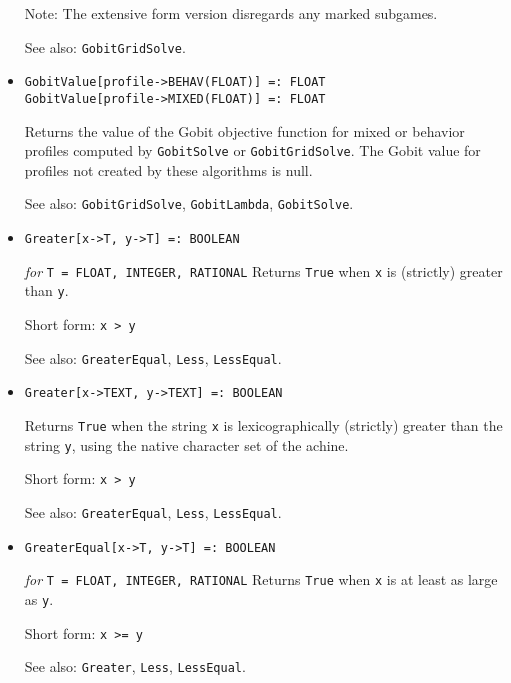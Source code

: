 \begin{itemize}
\item
[Note:] The extensive form version disregards any marked
subgames.
\item [See also:] \verb+GobitGridSolve+.
\ed

\item{}
\protect \large \begin{verbatim}
GobitValue[profile->BEHAV(FLOAT)] =: FLOAT
GobitValue[profile->MIXED(FLOAT)] =: FLOAT
\end{verbatim}\normalsize

\bd
Returns the value of the Gobit objective function for mixed or behavior
profiles computed by \verb+GobitSolve+ or \verb+GobitGridSolve+.  The Gobit
value for profiles not created by these algorithms is null.
\item
[See also:] \verb+GobitGridSolve+, \verb+GobitLambda+, \verb+GobitSolve+.
\ed

\item{}
\protect \large \begin{verbatim}
Greater[x->T, y->T] =: BOOLEAN
\end{verbatim}\normalsize

{\it for} {\tt T = FLOAT, INTEGER, RATIONAL}
\bd
Returns \verb+True+ when \verb+x+ is (strictly) greater than \verb+y+.
\item
[Short form:] \verb+x > y+
\item
[See also:] \verb+GreaterEqual+, \verb+Less+, \verb+LessEqual+.
\ed

\item{}
\protect \large \begin{verbatim}
Greater[x->TEXT, y->TEXT] =: BOOLEAN
\end{verbatim}\normalsize

\bd
Returns \verb+True+ when the string \verb+x+ is lexicographically (strictly)
greater than the string \verb+y+, using the native character set of the 
achine.
\item
[Short form:] \verb+x > y+
\item
[See also:] \verb+GreaterEqual+, \verb+Less+, \verb+LessEqual+.
\ed

\item{}
\protect \large \begin{verbatim}
GreaterEqual[x->T, y->T] =: BOOLEAN
\end{verbatim}\normalsize

{\it for} {\tt T = FLOAT, INTEGER, RATIONAL}
\bd
Returns \verb+True+ when \verb+x+ is at least as large as \verb+y+.
\item
[Short form:] \verb+x >= y+
\item
[See also:] \verb+Greater+, \verb+Less+, \verb+LessEqual+.
\ed


\end{itemize}

